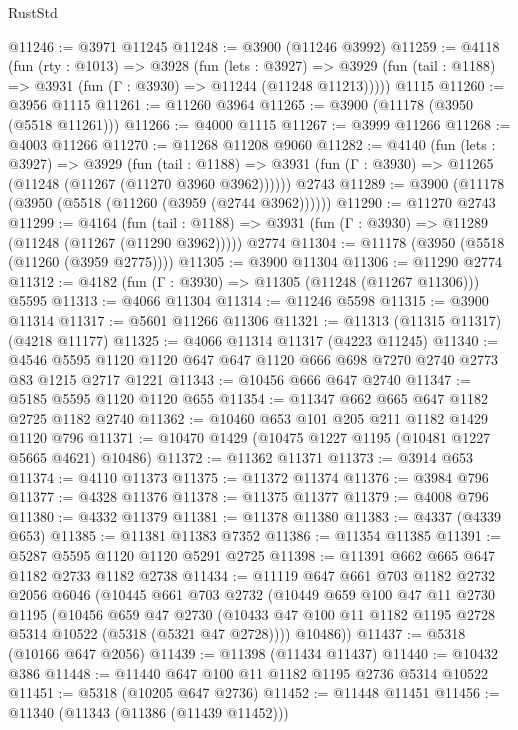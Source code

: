 \begin{lexlean}{RustStd}
\begin{coremodule}
@11246 := @3971 @11245
@11248 := @3900 (@11246 @3992)
@11259 := @4118
    (fun (rty : @1013) =>
    @3928
      (fun (lets : @3927) =>
      @3929 (fun (tail : @1188) => @3931 (fun (Γ : @3930) => @11244 (@11248 @11213)))))
    @1115
@11260 := @3956 @1115
@11261 := @11260 @3964
@11265 := @3900 (@11178 (@3950 (@5518 @11261)))
@11266 := @4000 @1115
@11267 := @3999 @11266
@11268 := @4003 @11266
@11270 := @11268 @11208 @9060
@11282 := @4140
    (fun (lets : @3927) =>
    @3929
      (fun (tail : @1188) =>
      @3931 (fun (Γ : @3930) => @11265 (@11248 (@11267 (@11270 @3960 @3962))))))
    @2743
@11289 := @3900 (@11178 (@3950 (@5518 (@11260 (@3959 (@2744 @3962))))))
@11290 := @11270 @2743
@11299 := @4164
    (fun (tail : @1188) => @3931 (fun (Γ : @3930) => @11289 (@11248 (@11267 (@11290 @3962)))))
    @2774
@11304 := @11178 (@3950 (@5518 (@11260 (@3959 @2775))))
@11305 := @3900 @11304
@11306 := @11290 @2774
@11312 := @4182 (fun (Γ : @3930) => @11305 (@11248 (@11267 @11306))) @5595
@11313 := @4066 @11304
@11314 := @11246 @5598
@11315 := @3900 @11314
@11317 := @5601 @11266 @11306
@11321 := @11313 (@11315 @11317) (@4218 @11177)
@11325 := @4066 @11314 @11317 (@4223 @11245)
@11340 := @4546 @5595 @1120 @1120 @647 @647 @1120 @666 @698 @7270 @2740 @2773 @83 @1215 @2717 @1221
@11343 := @10456 @666 @647 @2740
@11347 := @5185 @5595 @1120 @1120 @655
@11354 := @11347 @662 @665 @647 @1182 @2725 @1182 @2740
@11362 := @10460 @653 @101 @205 @211 @1182 @1429 @1120 @796
@11371 := @10470 @1429 (@10475 @1227 @1195 (@10481 @1227 @5665 @4621) @10486)
@11372 := @11362 @11371
@11373 := @3914 @653
@11374 := @4110 @11373
@11375 := @11372 @11374
@11376 := @3984 @796
@11377 := @4328 @11376
@11378 := @11375 @11377
@11379 := @4008 @796
@11380 := @4332 @11379
@11381 := @11378 @11380
@11383 := @4337 (@4339 @653)
@11385 := @11381 @11383 @7352
@11386 := @11354 @11385
@11391 := @5287 @5595 @1120 @1120 @5291 @2725
@11398 := @11391 @662 @665 @647 @1182 @2733 @1182 @2738
@11434 := @11119
    @647
    @661
    @703
    @1182
    @2732
    @2056
    @6046
    (@10445
      @661
      @703
      @2732
      (@10449
        @659
        @100
        @47
        @11
        @2730
        @1195
        (@10456
          @659
          @47
          @2730
          (@10433 @47 @100 @11 @1182 @1195 @2728 @5314 @10522 (@5318 (@5321 @47 @2728))))
        @10486))
@11437 := @5318 (@10166 @647 @2056)
@11439 := @11398 (@11434 @11437)
@11440 := @10432 @386
@11448 := @11440 @647 @100 @11 @1182 @1195 @2736 @5314 @10522
@11451 := @5318 (@10205 @647 @2736)
@11452 := @11448 @11451
@11456 := @11340 (@11343 (@11386 (@11439 @11452)))

\end{coremodule}
\end{lexlean}
